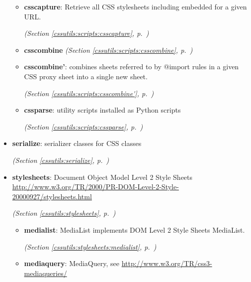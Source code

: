 \begin{itemize}
  \begin{itemize}
\setlength{\parskip}{0ex}
    \item \textbf{csscapture}: 
Retrieve all CSS stylesheets including embedded for a given URL.


  \textit{(Section \ref{cssutils:scripts:csscapture}, p.~\pageref{cssutils:scripts:csscapture})}

    \item \textbf{csscombine}
  \textit{(Section \ref{cssutils:scripts:csscombine}, p.~\pageref{cssutils:scripts:csscombine})}

    \item \textbf{csscombine'}: combines sheets referred to by @import rules in a given CSS proxy sheet
into a single new sheet. 


  \textit{(Section \ref{cssutils:scripts:csscombine'}, p.~\pageref{cssutils:scripts:csscombine'})}

    \item \textbf{cssparse}: 
utility scripts installed as Python scripts


  \textit{(Section \ref{cssutils:scripts:cssparse}, p.~\pageref{cssutils:scripts:cssparse})}

  \end{itemize}
\item \textbf{serialize}: 
serializer classes for CSS classes


  \textit{(Section \ref{cssutils:serialize}, p.~\pageref{cssutils:serialize})}

\item \textbf{stylesheets}: 
Document Object Model Level 2 Style Sheets
\href{http://www.w3.org/TR/2000/PR-DOM-Level-2-Style-20000927/stylesheets.html}{http://www.w3.org/TR/2000/PR-DOM-Level-2-Style-20000927/stylesheets.html}


  \textit{(Section \ref{cssutils:stylesheets}, p.~\pageref{cssutils:stylesheets})}

  \begin{itemize}
\setlength{\parskip}{0ex}
    \item \textbf{medialist}: 
MediaList implements DOM Level 2 Style Sheets MediaList.


  \textit{(Section \ref{cssutils:stylesheets:medialist}, p.~\pageref{cssutils:stylesheets:medialist})}

    \item \textbf{mediaquery}: 
MediaQuery, see \href{http://www.w3.org/TR/css3-mediaqueries/}{http://www.w3.org/TR/css3-mediaqueries/}



\end{itemize}
\end{itemize}
